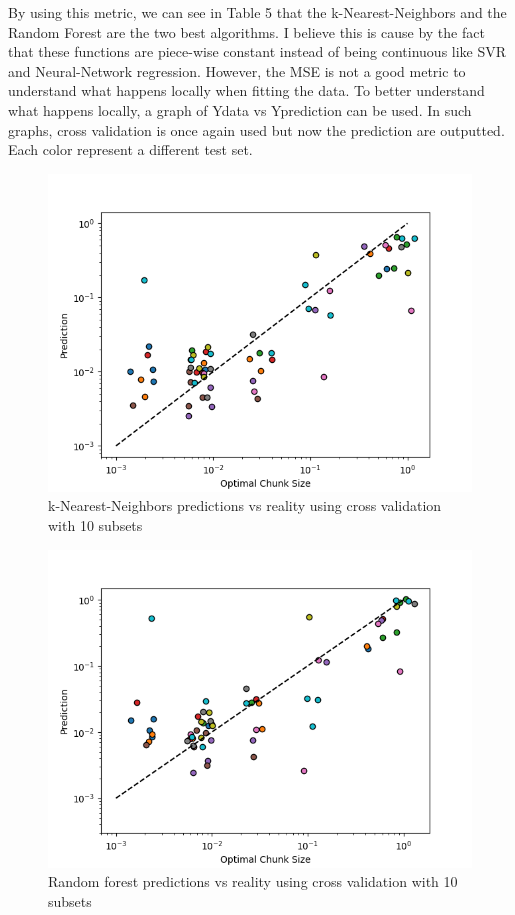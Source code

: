 By using this metric, we can see in Table 5 that the k-Nearest-Neighbors and the Random Forest are the two best algorithms. I believe this is cause by the fact that these functions are piece-wise constant instead of being continuous like SVR and Neural-Network regression. However, the MSE is not a good metric to understand what happens locally when fitting the data. To better understand what happens locally, a graph of Ydata vs Yprediction can be used. In such graphs, cross validation is once again used but now the prediction are outputted. Each color represent a different test set.

\begin{figure}[H]
	\centering
	\includegraphics[width=120mm]{images/KNNR_eval.png}
	\caption{k-Nearest-Neighbors predictions vs reality using cross validation with 10 subsets }
\end{figure}

\begin{figure}[H]
	\centering
	\includegraphics[width=120mm]{images/RFR_eval.png}
	\caption{Random forest predictions vs reality using cross validation with 10 subsets }
\end{figure}

